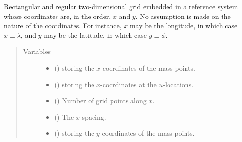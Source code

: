 \documentclass[letterpaper,10pt,english]{sphinxmanual}
\begin{document}
\begin{fulllineitems}
\label{\detokenize{api:tasmania.grids.grid_xy.GridXY}}
Rectangular and regular two-dimensional grid embedded in a reference system whose coordinates are,
in the order, \(x\) and \(y\). No assumption is made on the nature of the coordinates. For
instance, \(x\) may be the longitude, in which case \(x \equiv \lambda\), and \(y\) may
be the latitude, in which case \(y \equiv \phi\).
\begin{quote}\begin{description}
\item[{Variables}] \leavevmode\begin{itemize}
\item {} 
{\hyperref[\detokenize{api:tasmania.grids.grid_xyz.GridXYZ.x}]{}} () \textendash{} {\hyperref[\detokenize{api:tasmania.grids.axis.Axis}]{}} storing the \(x\)-coordinates of the mass points.

\item {} 
{\hyperref[\detokenize{api:tasmania.grids.grid_xyz.GridXYZ.x_at_u_locations}]{}} () \textendash{} {\hyperref[\detokenize{api:tasmania.grids.axis.Axis}]{}} storing the \(x\)-coordinates at the \(u\)-locations.

\item {} 
{\hyperref[\detokenize{api:tasmania.grids.grid_xyz.GridXYZ.nx}]{}} () \textendash{} Number of grid points along \(x\).

\item {} 
{\hyperref[\detokenize{api:tasmania.grids.grid_xyz.GridXYZ.dx}]{}} () \textendash{} The \(x\)-spacing.

\item {} 
{\hyperref[\detokenize{api:tasmania.grids.grid_xyz.GridXYZ.y}]{}} () \textendash{} {\hyperref[\detokenize{api:tasmania.grids.axis.Axis}]{}} storing the \(y\)-coordinates of the mass points.


\end{itemize}
\end{description}
\end{quote}
\end{fulllineitems}
\end{document}
